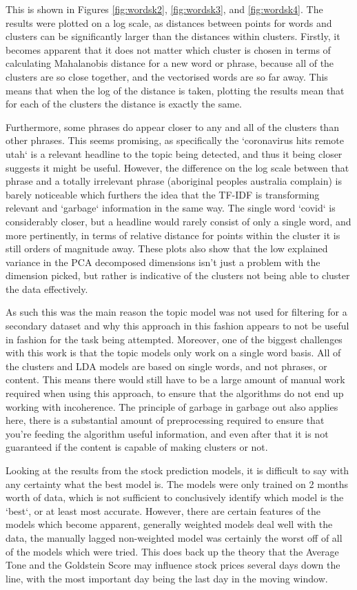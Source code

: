This is shown in Figures \ref{fig:wordsk2}, \ref{fig:wordsk3}, and \ref{fig:wordsk4}. The results were plotted on a log scale, as distances between points for words and clusters can be significantly larger than the distances within clusters. Firstly, it becomes apparent that it does not matter which cluster is chosen in terms of calculating Mahalanobis distance for a new word or phrase, because all of the clusters are so close together, and the vectorised words are so far away. This means that when the log of the distance is taken, plotting the results mean that for each of the clusters the distance is exactly the same. 

Furthermore, some phrases do appear closer to any and all of the clusters than other phrases. This seems promising, as specifically the `coronavirus hits remote utah` is a relevant headline to the topic being detected, and thus it being closer suggests it might be useful. However, the difference on the log scale between that phrase and a totally irrelevant phrase (aboriginal peoples australia complain) is barely noticeable which furthers the idea that the TF-IDF is transforming relevant and `garbage` information in the same way. The single word `covid` is considerably closer, but a headline would rarely consist of only a single word, and more pertinently, in terms of relative distance for points within the cluster it is still orders of magnitude away. These plots also show that the low explained variance in the PCA decomposed dimensions isn't just a problem with the dimension picked, but rather is indicative of the clusters not being able to cluster the data effectively. 

As such this was the main reason the topic model was not used for filtering for a secondary dataset and why this approach in this fashion appears to not be useful in fashion for the task being attempted. Moreover, one of the biggest challenges with this work is that the topic models only work on a single word basis. All of the clusters and LDA models are based on single words, and not phrases, or content. This means there would still have to be a large amount of manual work required when using this approach, to ensure that the algorithms do not end up working with incoherence. The principle of garbage in garbage out also applies here, there is a substantial amount of preprocessing required to ensure that you're feeding the algorithm useful information, and even after that it is not guaranteed if the content is capable of making clusters or not.

Looking at the results from the stock prediction models, it is difficult to say with any certainty what the best model is. The models were only trained on 2 months worth of data, which is not sufficient to conclusively identify which model is the `best`, or at least most accurate. However, there are certain features of the models which become apparent, generally weighted models deal well with the data, the manually lagged non-weighted model was certainly the worst off of all of the models which were tried. This does back up the theory that the Average Tone and the Goldstein Score may influence stock prices several days down the line, with the most important day being the last day in the moving window. 

